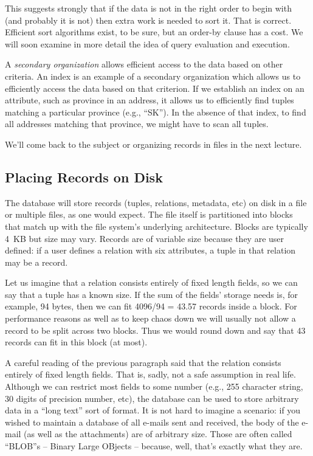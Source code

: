 \documentclass[a4paper]{report}
\begin{document}
This suggests strongly that if the data is not in the right order to begin with (and probably it is not) then extra work is needed to sort it. That is correct. Efficient sort algorithms exist, to be sure, but an order-by clause has a cost. We will soon examine in more detail the idea of query evaluation and execution.

A \textit{secondary organization} allows efficient access to the data based on other criteria. An index is an example of a secondary organization which allows us to efficiently access the data based on that criterion. If we establish an index on an attribute, such as province in an address, it allows us to efficiently find tuples matching a particular province (e.g., ``SK''). In the absence of that index, to find all addresses matching that province, we might have to scan all tuples.

We'll come back to the subject or organizing records in files in the next lecture.

\subsection*{Placing Records on Disk}

The database will store records (tuples, relations, metadata, etc) on disk in a file or multiple files, as one would expect. The file itself is partitioned into blocks that match up with the file system's underlying architecture. Blocks are typically 4~KB but size may vary. Records are of variable size because they are user defined: if a user defines a relation with six attributes, a tuple in that relation may be a record.

Let us imagine that a relation consists entirely of fixed length fields, so we can say that a tuple has a known size. If the sum of the fields' storage needs is, for example, 94 bytes, then we can fit 4096/94 = 43.57 records inside a block. For performance reasons as well as to keep chaos down we will usually not allow a record to be split across two blocks. Thus we would round down and say that 43 records can fit in this block (at most).

A careful reading of the previous paragraph said that the relation consists entirely of fixed length fields. That is, sadly, not a safe assumption in real life. Although we can restrict most fields to some number (e.g., 255 character string, 30 digits of precision number, etc), the database can be used to store arbitrary data in a ``long text'' sort of format. It is not hard to imagine a scenario: if you wished to maintain a database of all e-mails sent and received, the body of the e-mail (as well as the attachments) are of arbitrary size. Those are often called ``BLOB''s -- Binary Large OBjects -- because, well, that's exactly what they are. 
\end{document}

